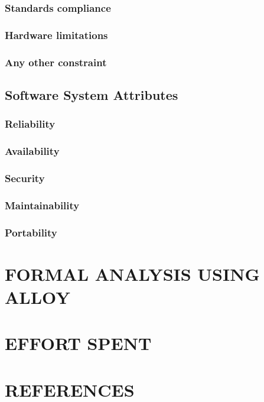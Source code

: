 \documentclass[11pt]{report}
\begin{document}
			\subsection{Standards compliance}
			\subsection{Hardware limitations}
			\subsection{Any other constraint}
		\section{Software System Attributes}
			\subsection{Reliability}
			\subsection{Availability}
			\subsection{Security}
			\subsection{Maintainability}
			\subsection{Portability}
	\chapter{FORMAL ANALYSIS USING ALLOY}
	\chapter{EFFORT SPENT}
	\chapter{REFERENCES}
\end{document}
